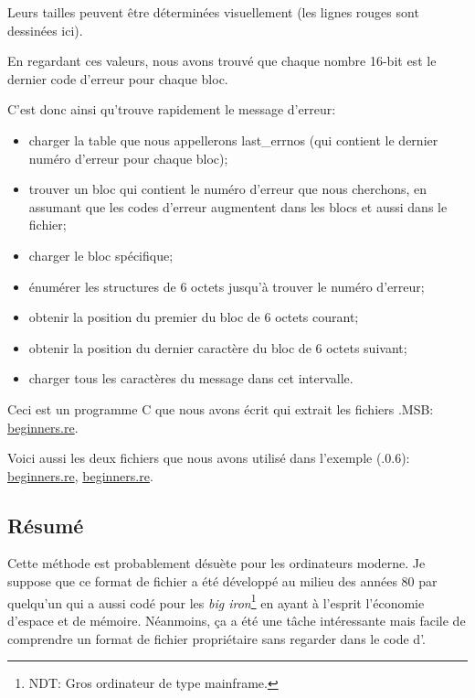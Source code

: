 Leurs tailles peuvent être déterminées visuellement (les lignes rouges sont
dessinées ici).

En regardant ces valeurs, nous avons trouvé que chaque nombre 16-bit est le dernier
code d'erreur pour chaque bloc.

C'est donc ainsi qu'\oracle trouve rapidement le message d'erreur:

\begin{itemize}
\item charger la table que nous appellerons last\_errnos (qui contient le dernier
numéro d'erreur pour chaque bloc);

\item trouver un bloc qui contient le numéro d'erreur que nous cherchons, en assumant
que les codes d'erreur augmentent dans les blocs et aussi dans le fichier;

\item charger le bloc spécifique;

\item énumérer les structures de 6 octets jusqu'à trouver le numéro d'erreur;

\item obtenir la position du premier du bloc de 6 octets courant;

\item obtenir la position du dernier caractère du bloc de 6 octets suivant;

\item charger tous les caractères du message dans cet intervalle.
\end{itemize}

Ceci est un programme C que nous avons écrit qui extrait les fichiers .MSB:
\href{http://go.yurichev.com/17213}{beginners.re}.

Voici aussi les deux fichiers que nous avons utilisé dans l'exemple
(.0.6):
\href{http://go.yurichev.com/17214}{beginners.re},
\href{http://go.yurichev.com/17215}{beginners.re}.

\subsection{Résumé}

Cette méthode est probablement désuète pour les ordinateurs moderne.
Je suppose que ce format de fichier a été développé au milieu des années 80 par
quelqu'un qui a aussi codé pour les \emph{big iron}\footnote{NDT: Gros ordinateur
de type mainframe.} en ayant à l'esprit l'économie d'espace et de mémoire.
Néanmoins, ça a été une tâche intéressante mais facile de comprendre
un format de fichier propriétaire sans regarder dans le code d'\oracle.
